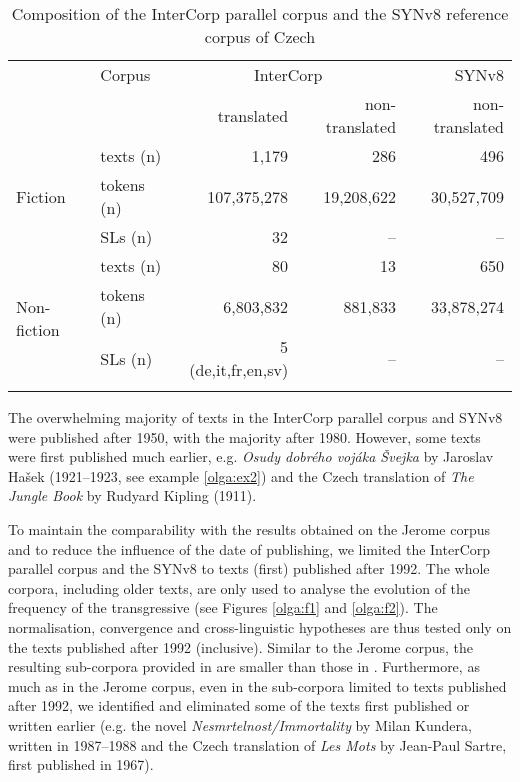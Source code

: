 \documentclass[output=paper,russian]{langsci/langscibook}
\begin{document}
\begin{table}\caption{Composition of the InterCorp parallel corpus and the SYNv8 reference corpus of Czech}\label{olga:t3}
  \begin{tabular}{llrrr}
    \lsptoprule
                                  & Corpus      & \multicolumn{2}{c}{InterCorp}                             & SYNv8\\
                                  &             & translated  & non-translated   & non-translated\\
    \midrule
    \multirow{3}{*}{Fiction}      & texts (n)   & 1,179       & 286                                         & 496\\
                                  & tokens (n)  & 107,375,278 & 19,208,622                                  & 30,527,709\\
                                  & SLs (n)     & 32          & --                                          & --\\
    \midrule
    \multirow{3}{*}{Non-fiction}  & texts (n)   & 80          & 13                                          & 650\\
                                  & tokens (n)  & 6,803,832   & 881,833                                     & 33,878,274\\
                                  & SLs (n)     & 5 (de,it,fr,en,sv) & --                                   & --\\
    \lspbottomrule
  \end{tabular}
\end{table}

\hspace*{-1mm}The overwhelming majority of texts in the InterCorp parallel corpus and SYNv8 were published after 1950, with the majority after 1980. However, some texts were first published much earlier, e.g. \textit{Osudy dobrého vojáka Švejka} by Jaroslav Hašek (1921--1923, see example \ref{olga:ex2}) and the Czech translation of \textit{The Jungle Book} by Rudyard Kipling (1911).

To maintain the comparability with the results obtained on the Jerome corpus and to reduce the influence of the date of publishing, we limited the InterCorp parallel corpus and the SYNv8 to texts (first) published after 1992. The whole corpora, including older texts, are only used to analyse the evolution of the frequency of the transgressive (see Figures \ref{olga:f1} and \ref{olga:f2}). The normalisation, convergence and cross-linguistic hypotheses are thus tested only on the texts published after 1992 (inclusive). Similar to the Jerome corpus, the resulting sub-corpora provided in  are smaller than those in . Furthermore, as much as in the Jerome corpus, even in the sub-corpora limited to texts published after 1992, we identified and eliminated some of the texts first published or written earlier (e.g. the novel \textit{Nesmrtelnost\slash Immortality} by Milan Kundera, written in 1987–1988 and the Czech translation of \textit{Les Mots }by Jean-Paul Sartre, first published in 1967).
\end{document}
